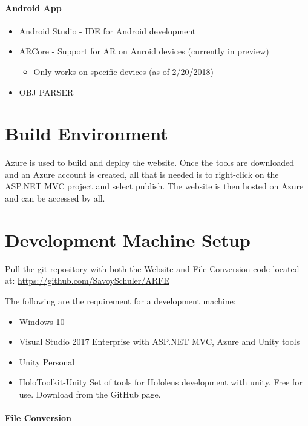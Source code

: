 \paragraph{Android App}
\begin{itemize}
    \item Android Studio - IDE for Android development
    \item ARCore - Support for AR on Anroid devices (currently in preview)
    \begin{itemize}
        \item Only works on specific devices (as of 2/20/2018)
    \end{itemize}
    \item OBJ PARSER
\end{itemize}

\section{Build  Environment}
Azure is used to build and deploy the website. Once the tools are downloaded and an Azure account is created, 
all that is needed is to right-click on the ASP.NET MVC project and select publish. The website is then hosted on Azure and
can be accessed by all.
\section{Development Machine Setup}

Pull the git repository with both the Website and File Conversion code located at: \url{https://github.com/SavoySchuler/ARFE}


The following are the requirement for a development machine:
\begin{itemize}
    \item Windows 10
    \item Visual Studio 2017 Enterprise with ASP.NET MVC, Azure and Unity tools
    \item Unity Personal
    \item HoloToolkit-Unity Set of tools for Hololens development with unity. Free for use. Download from the GitHub page.
\end{itemize}

\paragraph{File Conversion}

